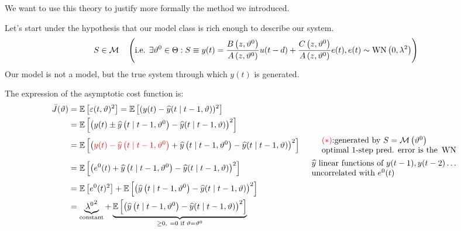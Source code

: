 We want to use this theory to justify more formally the method we introduced.

Let's start under the hypothesis that our model class is rich enough to describe our system.
\begin{equation*}
S\in \mathcal{M} \quad \left(\text{i.e. }\exists \vartheta ^{0} \in \Theta :S\equiv y(t) =\frac{B\left(z,\vartheta ^{0}\right)}{A\left(z,\vartheta ^{0}\right)} u(t-d) +\frac{C\left(z,\vartheta ^{0}\right)}{A\left(z,\vartheta ^{0}\right)} e(t) ,e(t) \sim \operatorname{WN} \left(0,\lambda ^{2}\right)\right)
\end{equation*}
Our model is not a model, but the true system through which $ y(t)$ is generated.

The expression of the asymptotic cost function is:
\begin{equation*}
\begin{aligned}
\bar{J}(\theta) & =\E\left[ \varepsilon (t,\theta)^{2}\right] =\E\left[(y(t) -\hat{y}(t\mid t-1,\theta))^{2}\right] & \\
 & =\E\left[\left(y(t) \pm \hat{y}\left(t\mid t-1,\theta ^{0}\right) -\hat{y}(t\mid t-1,\theta)\right)^{2}\right] & \\
 & =\E\left[\left(\textcolor[rgb]{1,0,0}{y(t) -\hat{y}\left(t\mid t-1,\theta^{0}\right)} +\hat{y}\left(t\mid t-1,\theta ^{0}\right) -\hat{y}(t\mid t-1,\theta)\right)^{2}\right] &  \begin{array}{l}
\textcolor[rgb]{1,0,0}{(*)}\text{:generated by } S=\Mc\left(\theta ^{0}\right)\\
\text{optimal 1-step pred. error is the } \WN
\end{array}\\
 & =\E\left[\left(e^{0}(t) +\hat{y}\left(t\mid t-1,\theta ^{0}\right) -\hat{y}(t\mid t-1,\theta)\right)^{2}\right] &  \begin{array}{l}
\hat{y} \text{ linear functions of } y(t-1),y(t-2) \ldots\\
\text{uncorrelated with } e^{0}(t)
\end{array}\\
 & =\E\left[ e^{0}(t)^{2}\right] +\E\left[\left(\hat{y}\left(t\mid t-1,\theta ^{0}\right) -\hat{y}(t\mid t-1,\theta)\right)^{2}\right] & \\
 & =\underbrace{\lambda {^{0}}^{2}}_{\text{constant}} +\underbrace{\E\left[\left(\hat{y}\left(t\mid t-1,\theta ^{0}\right) -\hat{y}(t\mid t-1,\theta)\right)^{2}\right]}_{\geq 0,\ =0\text{ if } \theta =\theta ^{0}} & 
\end{aligned}
\end{equation*}

